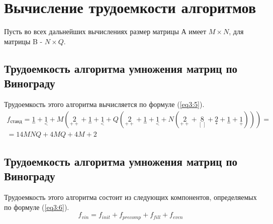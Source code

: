 \section{Вычисление трудоемкости алгоритмов}
Пусть во всех дальнейших вычислениях размер матрицы А имеет $M \times N$, для матрицы B - $N \times Q$.

\subsection{Трудоемкость алгоритма умножения матриц по Винограду}
Трудоемкость этого алгоритма вычисляется по формуле (\ref{eq3:5}).
\begin{multline}
	\label{eq3:5}
	f_{станд} = {\underset{=}{1}} + {\underset{<}{1}} + M({\underset{++}{2}} + {\underset{=}{1}} + {\underset{<}{1}} + Q({\underset{++}{2}} + {\underset{=}{1}} + {\underset{<}{1}} + N({\underset{++}{2}} + {\underset{[\ ]}{8}} + {\underset{*}{2}} + {\underset{=}{1}} + {\underset{+}{1}}))) = \\
	= 14MNQ + 4MQ + 4M + 2
\end{multline}

\subsection{Трудоемкость алгоритма умножения матриц по Винограду}
Трудоемкость этого алгоритма состоит из следующих компонентов, определяемых по формуле (\ref{eq3:6}).
\begin{equation}
	\label{eq3:6}
	f_{vin} = f_{init} + f_{precomp} + f_{fill} + f_{even}
\end{equation}
\newpage

